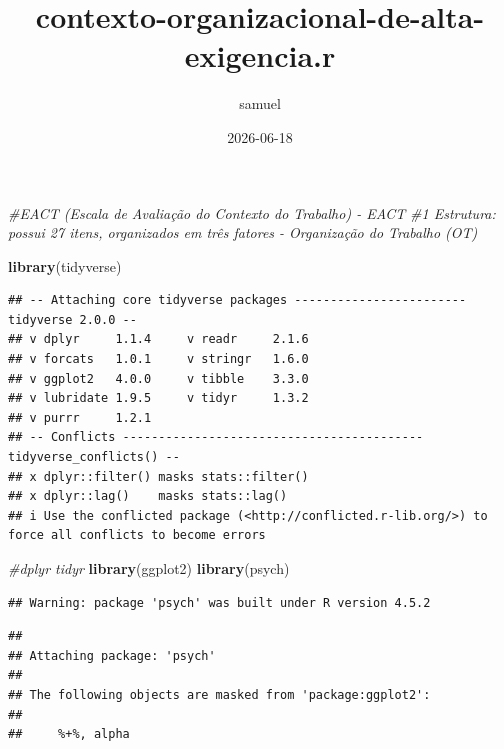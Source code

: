 \documentclass[
]{article}
\title{contexto-organizacional-de-alta-exigencia.r}
\author{samuel}
\date{2026-06-18}
\newenvironment{Shaded}{\begin{snugshade}}{\end{snugshade}}
\newcommand{\CommentTok}[1]{\textcolor[rgb]{0.56,0.35,0.01}{\textit{#1}}}
\newcommand{\FunctionTok}[1]{\textcolor[rgb]{0.13,0.29,0.53}{\textbf{#1}}}
\newcommand{\NormalTok}[1]{#1}
\begin{document}
\maketitle

\begin{Shaded}
\begin{Highlighting}[]
\CommentTok{\#EACT (Escala de Avaliação do Contexto do Trabalho) {-}  EACT}
\CommentTok{\#1 Estrutura: possui 27 itens, organizados em três fatores {-} Organização do Trabalho (OT) }

\FunctionTok{library}\NormalTok{(tidyverse)}
\end{Highlighting}
\end{Shaded}

\begin{verbatim}
## -- Attaching core tidyverse packages ------------------------ tidyverse 2.0.0 --
## v dplyr     1.1.4     v readr     2.1.6
## v forcats   1.0.1     v stringr   1.6.0
## v ggplot2   4.0.0     v tibble    3.3.0
## v lubridate 1.9.5     v tidyr     1.3.2
## v purrr     1.2.1     
## -- Conflicts ------------------------------------------ tidyverse_conflicts() --
## x dplyr::filter() masks stats::filter()
## x dplyr::lag()    masks stats::lag()
## i Use the conflicted package (<http://conflicted.r-lib.org/>) to force all conflicts to become errors
\end{verbatim}

\begin{Shaded}
\begin{Highlighting}[]
\CommentTok{\#dplyr tidyr}
\FunctionTok{library}\NormalTok{(ggplot2)}
\FunctionTok{library}\NormalTok{(psych)}
\end{Highlighting}
\end{Shaded}

\begin{verbatim}
## Warning: package 'psych' was built under R version 4.5.2
\end{verbatim}

\begin{verbatim}
## 
## Attaching package: 'psych'
## 
## The following objects are masked from 'package:ggplot2':
## 
##     %+%, alpha
\end{verbatim}
\end{document}
